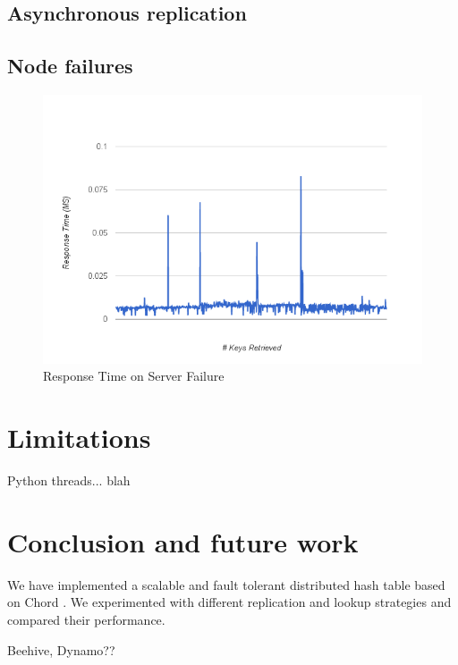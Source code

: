 \documentclass{sig-alternate-10pt}
\begin{document}
\subsection{Asynchronous replication}

\subsection{Node failures}

\begin{figure}[h]
\centering
\includegraphics[width=1\columnwidth]{./response-fail.png}
\caption{Response Time on Server Failure}
\label{fig:response-fail}
\end{figure}


\section{Limitations}
Python threads...  blah

\section{Conclusion and future work}
We have implemented a scalable and fault tolerant distributed hash table based on Chord \cite{chord}. We experimented with different replication and lookup strategies and compared their performance. 

Beehive, Dynamo??

\end{document}
